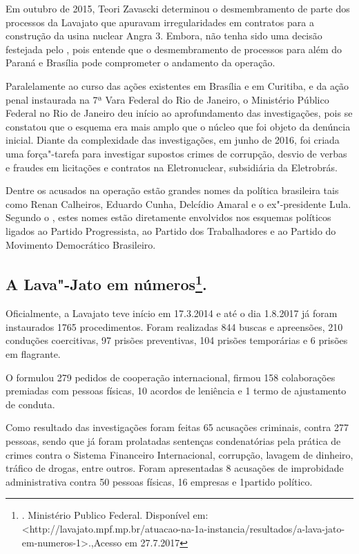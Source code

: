 Em outubro de 2015, Teori Zavascki determinou o desmembramento de parte
dos processos da Lavajato que apuravam irregularidades em contratos para
a construção da usina nuclear Angra 3. Embora, não tenha sido uma
decisão festejada pelo , pois entende que o desmembramento de
processos para além do Paraná e Brasília pode comprometer o andamento da
operação.

Paralelamente ao curso das ações existentes em Brasília e em Curitiba, e
da ação penal instaurada na 7ª Vara Federal do Rio de Janeiro, o
Ministério Público Federal no Rio de Janeiro deu início ao
aprofundamento das investigações, pois se constatou que o esquema era
mais amplo que o núcleo que foi objeto da denúncia inicial. Diante da
complexidade das investigações, em junho de 2016, foi criada uma
força"-tarefa para investigar supostos crimes de corrupção, desvio de
verbas e fraudes em licitações e contratos na Eletronuclear, subsidiária
da Eletrobrás.

Dentre os acusados na operação estão grandes nomes da política
brasileira tais como Renan Calheiros, Eduardo Cunha, Delcídio Amaral e o
ex"-presidente Lula. Segundo o , estes nomes estão diretamente
envolvidos nos esquemas políticos ligados ao Partido Progressista, ao
Partido dos Trabalhadores e ao Partido do Movimento Democrático
Brasileiro.

\subsection{A Lava"-Jato em números\footnote{. Ministério Publico
  Federal. Disponível em:
 \textless{}http://lavajato.mpf.mp.br/atuacao-na-1a-instancia/resultados/a-lava-jato-em-numeros-1\textgreater{}.,Acesso
  em 27.7.2017}.}

Oficialmente, a Lavajato teve início em 17.3.2014 e até o dia 1.8.2017
já foram instaurados 1765 procedimentos. Foram realizadas 844 buscas e
apreensões, 210 conduções coercitivas, 97 prisões preventivas, 104
prisões temporárias e 6 prisões em flagrante.

O  formulou 279 pedidos de cooperação internacional, firmou 158
colaborações premiadas com pessoas físicas, 10 acordos de leniência e 1
termo de ajustamento de conduta.

Como resultado das investigações foram feitas 65 acusações criminais,
contra 277 pessoas, sendo que já foram prolatadas sentenças
condenatórias pela prática de crimes contra o Sistema Financeiro
Internacional, corrupção, lavagem de dinheiro, tráfico de drogas, entre
outros. Foram apresentadas 8 acusações de improbidade administrativa
contra 50 pessoas físicas, 16 empresas e 1partido político.

